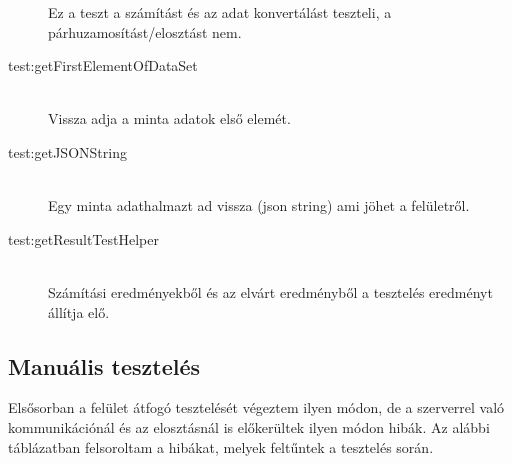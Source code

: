 \begin{description}
			Ez a teszt a számítást és az adat konvertálást teszteli, a párhuzamosítást/elosztást nem.
		\item[test:getFirstElementOfDataSet] \hfill \\
			Vissza adja a minta adatok első elemét.
		\item[test:getJSONString] \hfill \\
			Egy minta adathalmazt ad vissza (json string) ami jöhet a felületről.
		\item[test:getResultTestHelper] \hfill \\
			Számítási eredményekből és az elvárt eredményből a tesztelés eredményt állítja elő. 
	\end{description}

\subsection{Manuális tesztelés}
	Elsősorban a felület átfogó tesztelését végeztem ilyen módon, de a szerverrel való kommunikációnál és az elosztásnál is előkerültek ilyen módon hibák. \newline
	Az alábbi táblázatban felsoroltam a hibákat, melyek feltűntek a tesztelés során. 
